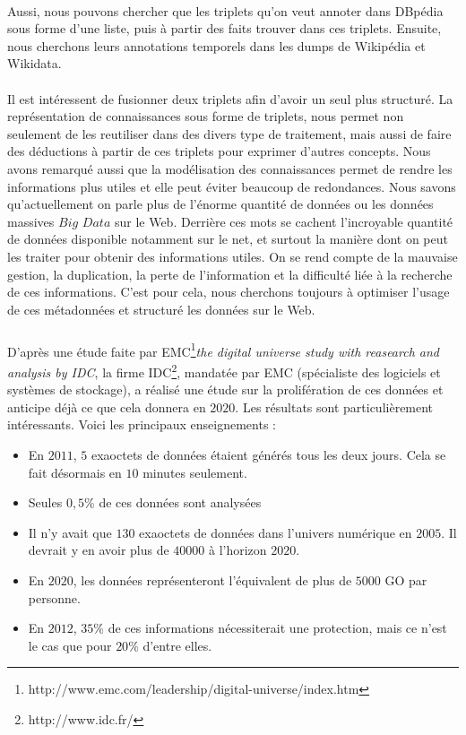 \paragraph{}
Aussi, nous pouvons chercher que les triplets qu'on veut annoter dans DBpédia sous forme d'une liste, puis à partir des faits trouver dans ces triplets. Ensuite, nous cherchons leurs annotations temporels dans les dumps de Wikipédia et Wikidata.
\paragraph{}
Il est intéressent de fusionner deux triplets afin d'avoir un seul plus structuré. La représentation de connaissances sous forme de triplets, nous permet non seulement de les reutiliser dans des divers type de traitement, mais aussi de faire des déductions à partir de ces triplets pour exprimer d'autres concepts. Nous avons remarqué aussi que la modélisation des connaissances permet de rendre les informations plus utiles et elle peut éviter beaucoup de redondances. Nous savons qu'actuellement on parle plus de l'énorme quantité de données ou les données massives $Big$ $Data$ sur le Web. Derrière ces mots se cachent l’incroyable quantité de données disponible notamment sur le net, et surtout la manière dont on peut les traiter pour obtenir des informations utiles. On se rend compte de la mauvaise gestion, la duplication, la perte de l'information et la difficulté liée à la recherche de ces informations. C'est pour cela, nous cherchons toujours à optimiser l'usage de ces métadonnées et structuré les données sur le Web.
\subparagraph{}
D'après une étude faite par EMC\footnote{http://www.emc.com/leadership/digital-universe/index.htm}{\it the digital universe study with  reasearch and analysis by IDC}, la firme IDC\footnote{http://www.idc.fr/}, mandatée par EMC (spécialiste des logiciels et systèmes de stockage), a réalisé une étude sur la prolifération de ces données et anticipe déjà ce que cela donnera en $2020$. Les résultats sont particulièrement intéressants. Voici les principaux enseignements :
\begin{itemize}
\item En $2011$, $5$ exaoctets de données étaient générés tous les deux jours. Cela se fait désormais en $10$ minutes seulement.
\item Seules $0,5$\% de ces données sont analysées
\item Il n’y avait que $130$ exaoctets de données dans l’univers numérique en $2005$. Il devrait y en avoir plus de $40 000$ à l’horizon $2020$.
\item En $2020$, les données représenteront l’équivalent de plus de $5 000$ GO par personne.
\item En $2012$, $35$\% de ces informations nécessiterait une protection, mais ce n’est le cas que pour $20$\% d’entre elles.
\end{itemize}
